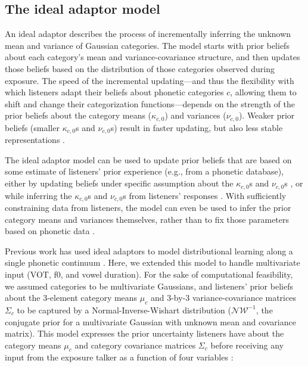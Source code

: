 \documentclass[
  11pt,
  man,mask,floatsintext]{apa6}
\begin{document}
\subsection{The ideal adaptor model}\label{the-ideal-adaptor-model}

An ideal adaptor describes the process of incrementally inferring the unknown mean and variance of Gaussian categories. The model starts with prior beliefs about each category's mean and variance-covariance structure, and then updates those beliefs based on the distribution of those categories observed during exposure. The speed of the incremental updating---and thus the flexibility with which listeners adapt their beliefs about phonetic categories \(c\), allowing them to shift and change their categorization functions---depends on the strength of the prior beliefs about the category means (\(\kappa_{c,0}\)) and variances (\(\nu_{c,0}\)). Weaker prior beliefs (smaller \(\kappa_{c,0}\)s and \(\nu_{c,0}\)s) result in faster updating, but also less stable representations \autocite[for in depth description and discussion of the model, see][]{kleinschmidt-jaeger2015}.

The ideal adaptor model can be used to update prior beliefs that are based on some estimate of listeners' prior experience (e.g., from a phonetic database), either by updating beliefs under specific assumption about the \(\kappa_{c,0}\)s and \(\nu_{c,0}\)s \autocites[as done in][]{cummings-theodore2023,hitczenko-feldman2016,theodore-monto2019,xie2023}, or while inferring the \(\kappa_{c,0}\)s and \(\nu_{c,0}\)s from listeners' responses \autocites[as done in][]{kleinschmidt-jaeger2011,kleinschmidt-jaeger2012}. With sufficiently constraining data from listeners, the model can even be used to infer the prior category means and variances themselves, rather than to fix those parameters based on phonetic data \autocites[e.g.,][]{kleinschmidt2020,kleinschmidt-jaeger2016}.

Previous work has used ideal adaptors to model distributional learning along a single phonetic continuum \autocites[e.g.,][]{cummings-theodore2023,kleinschmidt-jaeger2011,kleinschmidt-jaeger2012,theodore-monto2019}. Here, we extended this model to handle multivariate input (VOT, f0, and vowel duration). For the sake of computational feasibility, we assumed categories to be multivariate Gaussians, and listeners' prior beliefs about the 3-element category means \(\mu_{c}\) and 3-by-3 variance-covariance matrices \(\Sigma_{c}\) to be captured by a Normal-Inverse-Wishart distribution (\(\mathcal{NW^{-1}}\), the conjugate prior for a multivariate Gaussian with unknown mean and covariance matrix). This model expresses the prior uncertainty listeners have about the category means \(\mu_{c}\) and category covariance matrices \(\Sigma_{c}\) before receiving any input from the exposure talker as a function of four variables \autocite[for derivation, see][p.~132-3]{murphy2012}:
\end{document}
